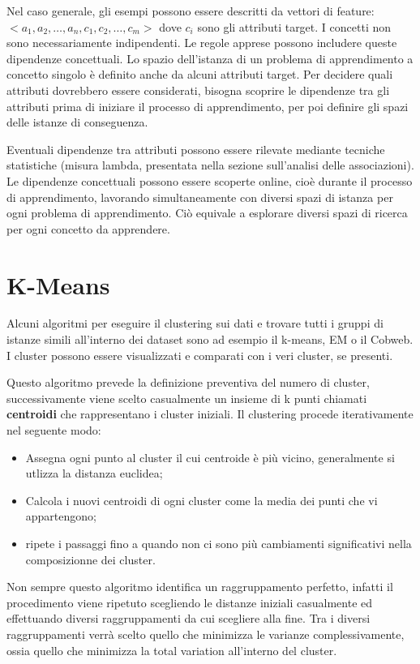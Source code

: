 \documentclass[a4paper]{extarticle}
\begin{document}
Nel caso generale, gli esempi possono essere descritti da vettori di feature: $<a_1,a_2,\dots,a_n,c_1,c_2,\dots,c_m>$ dove $c_i$ sono gli attributi target. I concetti non sono necessariamente indipendenti. Le regole apprese possono includere queste dipendenze concettuali. Lo spazio dell'istanza di un problema di apprendimento a concetto singolo è definito anche da alcuni attributi target. Per decidere quali attributi dovrebbero essere considerati, bisogna scoprire le dipendenze tra gli attributi prima di iniziare il processo di apprendimento, per poi definire gli spazi delle istanze di conseguenza.

Eventuali dipendenze tra attributi possono essere rilevate mediante tecniche statistiche (misura lambda, presentata nella sezione sull'analisi delle associazioni). Le dipendenze concettuali possono essere scoperte online, cioè durante il processo di apprendimento, lavorando simultaneamente con diversi spazi di istanza per ogni problema di apprendimento. Ciò equivale a esplorare diversi spazi di ricerca per ogni concetto da apprendere.

\newpage

\section{K-Means}

Alcuni algoritmi per eseguire il clustering sui dati e trovare tutti i gruppi di istanze simili all'interno dei dataset sono ad esempio il k-means, EM o il Cobweb. I cluster possono essere visualizzati e comparati con i veri cluster, se presenti.

Questo algoritmo prevede la definizione preventiva del numero di cluster, successivamente viene scelto casualmente un insieme di k punti chiamati \textbf{centroidi} che rappresentano i cluster iniziali. Il clustering procede iterativamente nel seguente modo:

\begin{itemize}
\item Assegna ogni punto al cluster il cui centroide è più vicino, generalmente si utlizza la distanza euclidea;
\item Calcola i nuovi centroidi di ogni cluster come la media dei punti che vi appartengono;
\item ripete i passaggi fino a quando non ci sono più cambiamenti significativi nella composizionne dei cluster.
\end{itemize}

Non sempre questo algoritmo identifica un raggruppamento perfetto, infatti il procedimento viene ripetuto scegliendo le distanze iniziali casualmente ed effettuando diversi raggruppamenti da cui scegliere alla fine. Tra i diversi raggruppamenti verrà scelto quello che minimizza le varianze complessivamente, ossia quello che minimizza la total variation all'interno del cluster.
\end{document}
